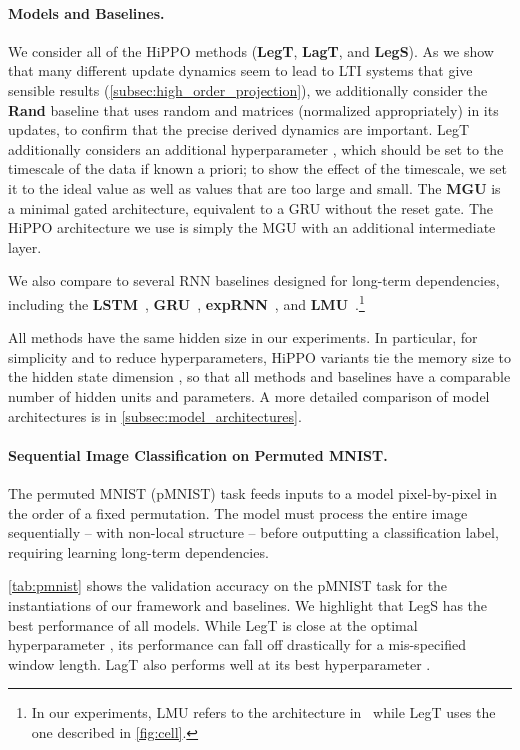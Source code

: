 \documentclass{article}
\begin{document}
\paragraph{Models and Baselines.}
We consider all of the HiPPO methods (\textbf{LegT}, \textbf{LagT}, and \textbf{LegS}).
As we show that many different update dynamics seem to lead to LTI systems that give sensible results (\cref{subsec:high_order_projection}), we additionally consider the \textbf{Rand} baseline that uses random  and  matrices (normalized appropriately) in its updates,
to confirm that the precise derived dynamics are important.
LegT additionally considers an additional hyperparameter , which should be set to the timescale of the data if known a priori; to show the effect of the timescale, we set it to the ideal value as well as values that are too large and small.
The \textbf{MGU} is a minimal gated architecture, equivalent to a GRU without the reset gate. The HiPPO architecture we use is simply the MGU with an additional  intermediate layer.

We also compare to several RNN baselines designed for long-term dependencies, including the
\textbf{LSTM}~\cite{lstm}, \textbf{GRU}~\cite{chung2014empirical}, \textbf{expRNN}~\citep{lezcano2019cheap}, and \textbf{LMU}~\citep{voelker2019legendre}.\footnote{In our experiments, LMU refers to the architecture in~\citep{voelker2019legendre} while LegT uses the one described in \cref{fig:cell}.}

All methods have the same hidden size in our experiments.
In particular, for simplicity and to reduce hyperparameters, HiPPO variants tie the memory size  to the hidden state dimension , so that all methods and baselines have a comparable number of hidden units and parameters.
A more detailed comparison of model architectures is in \cref{subsec:model_architectures}.



\paragraph{Sequential Image Classification on Permuted MNIST.}
The permuted MNIST (pMNIST) task feeds inputs to a model pixel-by-pixel in the order of a fixed permutation.
The model must process the entire image sequentially -- with non-local structure -- before
outputting a classification label, requiring learning long-term dependencies.

\cref{tab:pmnist} shows the validation accuracy on the pMNIST task for
the instantiations of our framework and baselines.
We highlight that LegS has the best performance of all models.
While LegT is close at the optimal hyperparameter , its performance can fall off drastically for a mis-specified window length.
LagT also performs well at its best hyperparameter .
\end{document}
